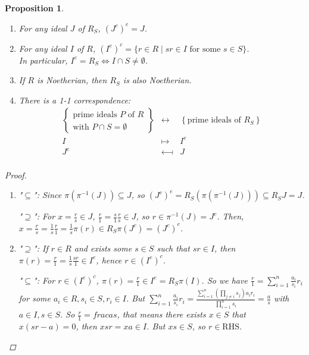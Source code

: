 \documentclass[a4paper]{article}
\theoremstyle{mystyle}
\newtheorem{prop}{Proposition}
\begin{document}
\begin{prop}
  $\ $
  \begin{enumerate}
    \item For any ideal $J$ of $R_S$, $(J^c)^e = J$.
    \item For any ideal $I$ of $R$, $(I^e)^c = \{r \in R \mid sr \in I \textrm{ for some } s \in S\}$. \\
      In particular, $I^e = R_S \iff I \cap S \neq \emptyset$.
    \item If $R$ is Noetherian, then $R_S$ is also Noetherian.
    \item There is a 1-1 correspondence:
      \[
        \begin{array}{ccc}
          \left\{ \begin{array}{c} \textrm{prime ideals $P$ of $R$} \\ 
          \textrm{with }P \cap S = \emptyset \end{array} \right\} 
          &\longleftrightarrow& \left\{\textrm{prime ideals of $R_S$} \right\} \\
          I &\longmapsto& I^e \\
          J^c &\longmapsfrom& J \\
      \end{array}
      \]
  \end{enumerate}

  \begin{proof}
    $\ $
    \begin{enumerate}
      \item 
        "$\subseteq$":
        Since $\pi(\pi^{-1}(J)) \subseteq J$, so 
        $(J^c)^e = R_S(\pi(\pi^{-1}(J))) \subseteq R_S J = J$.

        "$\supseteq$":
        For $x = \frac{r}{s} \in J$, $\frac{r}{1} = \frac{s}{1}\frac{r}{s} \in J$, so $r \in \pi^{-1}(J) = J^c$.
        Then, $x = \frac{r}{s} = \frac{1}{s}\frac{r}{1} = \frac{1}{s} \pi(r) \in R_S \pi(J^c) = (J^c)^e$.

      \item 
        "$\supseteq$":
        If $r \in R$ and exists some $s \in S$ such that $sr \in I$, then 
        $\pi(r) = \frac{r}{1} = \frac{1}{s}\frac{sr}{1} \in I^e$, hence $r \in (I^e)^c$.

        "$\subseteq$":
        For $r \in (I^e)^c$, $\pi(r) = \frac{r}{1} \in I^e = R_S \pi(I)$. So we have
        $\frac{r}{1} = \sum_{i=1}^n \frac{a_i}{s_i}r_i$ for some $a_i \in R, s_i \in S, r_i \in I$.
        But $\sum_{i=1}^n \frac{a_i}{s_i}r_i = 
        \frac{\sum\limits_{i=1}^n \left(\prod_{j\neq i} s_j \right) a_ir_i}{\prod_{i=1}^n s_i}
        = \frac{a}{s}$ with $a \in I, s \in S$.
        So $\frac{r}{1} = frac{a}{s}$, that means there exists $x \in S$ that $x(sr-a) = 0$, 
        then $xsr = xa \in I$. But $xs \in S$, so $r \in \textrm{RHS}$.


\end{enumerate}
\end{proof}
\end{prop}
\end{document}
